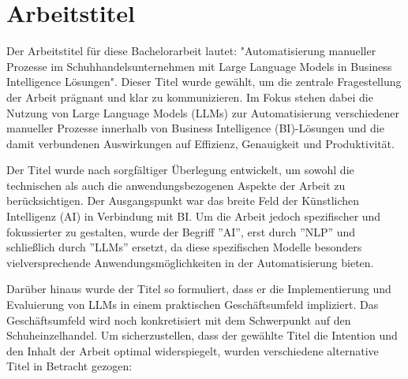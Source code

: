 

\section{Arbeitstitel}

Der Arbeitstitel für diese Bachelorarbeit lautet: "Automatisierung manueller Prozesse im Schuhhandelsunternehmen mit Large Language Models in Business Intelligence Lösungen". Dieser Titel wurde gewählt, um die zentrale Fragestellung der Arbeit prägnant und klar zu kommunizieren. Im Fokus stehen dabei die Nutzung von Large Language Models (LLMs) zur Automatisierung verschiedener manueller Prozesse innerhalb von Business Intelligence (BI)-Lösungen und die damit verbundenen Auswirkungen auf Effizienz, Genauigkeit und Produktivität.

Der Titel wurde nach sorgfältiger Überlegung entwickelt, um sowohl die technischen als auch die anwendungsbezogenen Aspekte der Arbeit zu berücksichtigen. Der Ausgangspunkt war das breite Feld der Künstlichen Intelligenz (AI) in Verbindung mit BI. Um die Arbeit jedoch spezifischer und fokussierter zu gestalten, wurde der Begriff ''AI'', erst durch ''NLP'' und schließlich durch ''LLMs'' ersetzt, da diese spezifischen Modelle besonders vielversprechende Anwendungsmöglichkeiten in der Automatisierung bieten.

Darüber hinaus wurde der Titel so formuliert, dass er die Implementierung und Evaluierung von LLMs in einem praktischen Geschäftsumfeld impliziert. Das Geschäftsumfeld wird noch konkretisiert mit dem Schwerpunkt auf den Schuheinzelhandel.
Um sicherzustellen, dass der gewählte Titel die Intention und den Inhalt der Arbeit optimal widerspiegelt, wurden verschiedene alternative Titel in Betracht gezogen:

